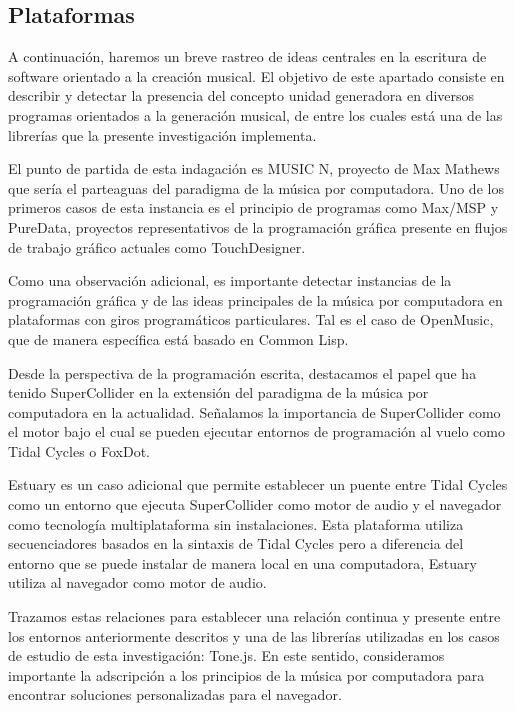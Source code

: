 
\subsection{Plataformas}

A continuación, haremos un breve rastreo de ideas centrales en la escritura de software orientado a la creación musical. El objetivo de este apartado consiste en describir y detectar la presencia del concepto unidad generadora en diversos programas orientados a la generación musical, de entre los cuales está una de las librerías que la presente investigación implementa.

El punto de partida de esta indagación es MUSIC N, proyecto de Max Mathews que sería el parteaguas del paradigma de la música por computadora. Uno de los primeros casos de esta instancia es el principio de programas como Max/MSP y PureData, proyectos representativos de la programación gráfica presente en flujos de trabajo gráfico actuales como TouchDesigner.

Como una observación adicional, es importante detectar instancias de la programación gráfica y de las ideas principales de la música por computadora en plataformas con giros programáticos particulares. Tal es el caso de OpenMusic, que de manera específica está basado en Common Lisp.

Desde la perspectiva de la programación escrita, destacamos el papel que ha tenido SuperCollider en la extensión del paradigma de la música por computadora en la actualidad. Señalamos la importancia de SuperCollider como el motor bajo el cual se pueden ejecutar entornos de programación al vuelo como Tidal Cycles o FoxDot. 

Estuary es un caso adicional que permite establecer un puente entre Tidal Cycles como un entorno que ejecuta SuperCollider como motor de audio y el navegador como tecnología multiplataforma sin instalaciones. Esta plataforma utiliza secuenciadores basados en la sintaxis de Tidal Cycles pero a diferencia del entorno que se puede instalar de manera local en una computadora, Estuary utiliza al navegador como motor de audio. 

Trazamos estas relaciones para establecer una relación continua y presente entre los entornos anteriormente descritos y una de las librerías utilizadas en los casos de estudio de esta investigación: Tone.js. En este sentido, consideramos importante la adscripción a los principios de la música por computadora para encontrar soluciones personalizadas para el navegador.

